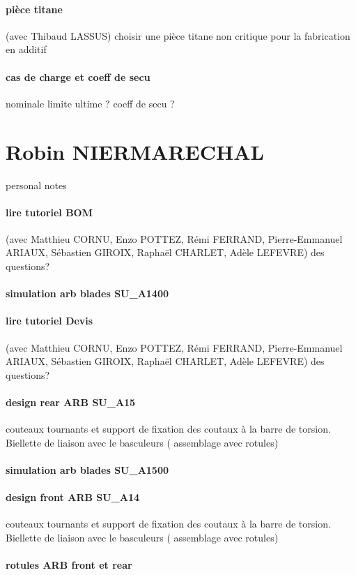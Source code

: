 \paragraph{pièce titane} (avec Thibaud LASSUS) choisir une pièce titane non critique pour la fabrication en additif
\paragraph{cas de charge et coeff de secu} nominale limite ultime ? coeff de secu ?

 
 \newpage \section*{Robin NIERMARECHAL} 
 \par personal notes
\paragraph{lire tutoriel BOM} (avec Matthieu CORNU, Enzo POTTEZ, Rémi FERRAND, Pierre-Emmanuel ARIAUX, Sébastien GIROIX, Raphaël CHARLET, Adèle LEFEVRE) des questions?
\paragraph{simulation arb blades SU\_A1400} 
\paragraph{lire tutoriel Devis} (avec Matthieu CORNU, Enzo POTTEZ, Rémi FERRAND, Pierre-Emmanuel ARIAUX, Sébastien GIROIX, Raphaël CHARLET, Adèle LEFEVRE) des questions?
\paragraph{design rear ARB SU\_A15} couteaux tournants et support de fixation des coutaux à la barre de torsion. Biellette de liaison avec le basculeurs ( assemblage avec rotules)
\paragraph{simulation arb blades SU\_A1500} 
\paragraph{design front ARB SU\_A14} couteaux tournants et support de fixation des coutaux à la barre de torsion. Biellette de liaison avec le basculeurs ( assemblage avec rotules)
\paragraph{rotules ARB front et rear} 
